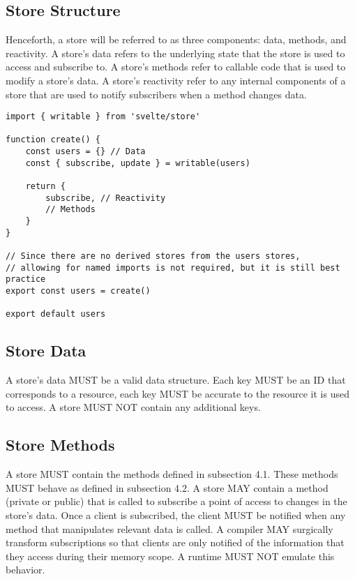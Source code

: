 \documentclass{article}
\begin{document}
\subsection{Store Structure}

Henceforth, a store will be referred to as three components: data, methods, and reactivity. A store's data refers to the underlying state that the store is used to access and subscribe to. A store's methods refer to callable code that is used to modify a store's data. A store's reactivity refer to any internal components of a store that are used to notify subscribers when a method changes data.

\begin{lstlisting}[caption={Data, Reactivity, and Methods}]
import { writable } from 'svelte/store'

function create() {
    const users = {} // Data
    const { subscribe, update } = writable(users)
    
    return {
        subscribe, // Reactivity
        // Methods
    }
}

// Since there are no derived stores from the users stores,
// allowing for named imports is not required, but it is still best practice
export const users = create()

export default users
\end{lstlisting}

\subsection{Store Data}
A store's data MUST be a valid data structure. Each key MUST be an ID that corresponds to a resource, each key MUST be accurate to the resource it is used to access. A store MUST NOT contain any additional keys.

\subsection{Store Methods}
A store MUST contain the methods defined in subsection 4.1. These methods MUST behave as defined in subsection 4.2. A store MAY contain a method (private or public) that is called to subscribe a point of access to changes in the store's data. Once a client is subscribed, the client MUST be notified when any method that manipulates relevant data is called. A compiler MAY surgically transform subscriptions so that clients are only notified of the information that they access during their memory scope. A runtime MUST NOT emulate this behavior.
\end{document}
